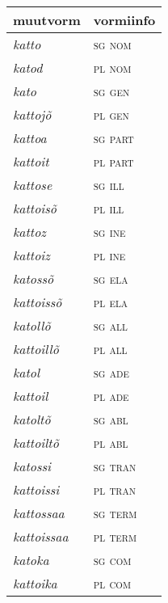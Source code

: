 \documentclass[12pt,a4paper]{article}
\begin{document}
\begin{table}[H] %
      \footnotesize
  \begin{minipage}[t]{.40\textwidth}
    \begin{tabular}[t]{l l}
      muutvorm            & vormiinfo \\ \hline
      \textit{katto}      & \textsc{sg nom} \\
      \textit{katod}      & \textsc{pl nom} \\
      \textit{kato}       & \textsc{sg gen} \\
      \textit{kattojõ}    & \textsc{pl gen} \\
      \textit{kattoa}     & \textsc{sg part} \\
      \textit{kattoit}    & \textsc{pl part} \\
      \textit{kattose}    & \textsc{sg ill} \\
      \textit{kattoisõ}   & \textsc{pl ill} \\
      \textit{kattoz}     & \textsc{sg ine} \\
      \textit{kattoiz}    & \textsc{pl ine} \\
      \textit{katossõ}    & \textsc{sg ela} \\
      \textit{kattoissõ}  & \textsc{pl ela} \\
      \textit{katollõ}    & \textsc{sg all} \\
      \textit{kattoillõ}  & \textsc{pl all} \\
      \textit{katol}      & \textsc{sg ade} \\
      \textit{kattoil}    & \textsc{pl ade} \\
      \textit{katoltõ}    & \textsc{sg abl} \\
      \textit{kattoiltõ}  & \textsc{pl abl} \\
      \textit{katossi}    & \textsc{sg tran} \\
      \textit{kattoissi}  & \textsc{pl tran} \\
      \textit{kattossaa}  & \textsc{sg term} \\
      \textit{kattoissaa} & \textsc{pl term} \\
      \textit{katoka}     & \textsc{sg com} \\
      \textit{kattoika}   & \textsc{pl com} \\
    \end{tabular}

\end{minipage}
\end{table}
\end{document}
